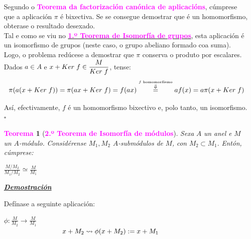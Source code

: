 \documentclass[twoside]{report}
\newcommand{\magbf}[1]{\textcolor{magenta}{\textbf{#1}}} %
\theoremstyle{mystyle}
\newtheorem{theo}{\magbf{Teorema}}[chapter]
\newenvironment{theorem}
{\begin{mdframed}[linecolor = magenta,backgroundcolor = classicrose, linewidth = 2mm]\begin{theo}}
{\end{theo}\end{mdframed}}
\begin{document}
\noindent Segundo o \magbf{Teorema da factorización canónica de aplicacións}, cúmprese que a aplicación $\pi$ é bixectiva. Se se consegue demostrar que é un homomorfismo, obterase o resultado desexado.\\

\noindent Tal e como se viu no \hyperref[th1.5]{\magbf{1.º Teorema de Isomorfía de grupos}}, esta aplicación é un isomorfismo de grupos (neste caso, o grupo abeliano formado coa suma). Logo, o problema redúcese a demostrar que $\pi$ conserva o produto por escalares.\\

\noindent Dados $a \in A$ e $x + Ker \hspace{1mm} f \in \displaystyle \frac{M}{Ker \hspace{1mm} f}$, tense:
$$\pi(a(x + Ker \hspace{1mm}f)) = \pi(ax + Ker \hspace{1mm} f) = f(ax) \overset{\overset{f \text{ homomorfismo}}{\Downarrow}}{=} af(x) = a\pi(x + Ker \hspace{1mm} f)$$

\noindent Así, efectivamente, $f$ é un homomorfismo bixectivo e, polo tanto, un isomorfismo. $\square$\pagebreak

\begin{theorem}[\magbf{2.º Teorema de Isomorfía de módulos}] \label{th3.2}
Sexa $A$ un anel e $M$ un $A$-módulo. Considérense $M_{1},M_{2}$ $A$-submódulos de $M$, con $M_{2} \subset M_{1}$. Entón, cúmprese:
\begin{center}
    $\displaystyle \frac{M/M_{2}}{M_{1}/M_{2}} \simeq \displaystyle \frac{M}{M_{1}}$
\end{center}
\end{theorem}

\vspace{2mm}

\noindent \textbf{\textit{\underline{Demostración}}}

\vspace{2mm}

\noindent Defínase a seguinte aplicación:

\begin{center}
    $\phi: \displaystyle \frac{M}{M_{2}} \longrightarrow \displaystyle \frac{M}{M_{1}}$\\
    \vspace{2mm}
    $\hspace{30mm} x + M_{2} \leadsto \phi(x + M_{2}) := x + M_{1}$
\end{center}
\end{document}
